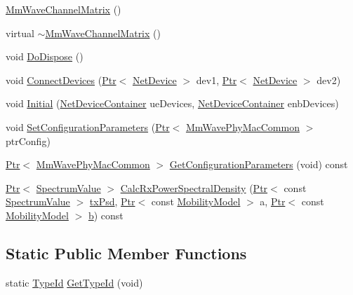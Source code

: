 \begin{DoxyCompactItemize}
\item 
\hyperlink{classns3_1_1MmWaveChannelMatrix_add4feba12917b68e698d28204e67b2cc}{Mm\+Wave\+Channel\+Matrix} ()
\item 
virtual \hyperlink{classns3_1_1MmWaveChannelMatrix_a078a11472a5d2fb7ad31315ba17a2930}{$\sim$\+Mm\+Wave\+Channel\+Matrix} ()
\item 
void \hyperlink{classns3_1_1MmWaveChannelMatrix_a7a20406655c992c2d0e2ffcb67646998}{Do\+Dispose} ()
\item 
void \hyperlink{classns3_1_1MmWaveChannelMatrix_a5ce6561e412404f9da4ef0cd4c6074b6}{Connect\+Devices} (\hyperlink{classns3_1_1Ptr}{Ptr}$<$ \hyperlink{classns3_1_1NetDevice}{Net\+Device} $>$ dev1, \hyperlink{classns3_1_1Ptr}{Ptr}$<$ \hyperlink{classns3_1_1NetDevice}{Net\+Device} $>$ dev2)
\item 
void \hyperlink{classns3_1_1MmWaveChannelMatrix_ab33b65ac0dd3750c6b7856947150ec04}{Initial} (\hyperlink{classns3_1_1NetDeviceContainer}{Net\+Device\+Container} ue\+Devices, \hyperlink{classns3_1_1NetDeviceContainer}{Net\+Device\+Container} enb\+Devices)
\item 
void \hyperlink{classns3_1_1MmWaveChannelMatrix_ac296d6652dbde383f9c9b03494c1f8fe}{Set\+Configuration\+Parameters} (\hyperlink{classns3_1_1Ptr}{Ptr}$<$ \hyperlink{classns3_1_1MmWavePhyMacCommon}{Mm\+Wave\+Phy\+Mac\+Common} $>$ ptr\+Config)
\item 
\hyperlink{classns3_1_1Ptr}{Ptr}$<$ \hyperlink{classns3_1_1MmWavePhyMacCommon}{Mm\+Wave\+Phy\+Mac\+Common} $>$ \hyperlink{classns3_1_1MmWaveChannelMatrix_abd1ba6a33c5eb270875f54fabec7a19b}{Get\+Configuration\+Parameters} (void) const 
\item 
\hyperlink{classns3_1_1Ptr}{Ptr}$<$ \hyperlink{classns3_1_1SpectrumValue}{Spectrum\+Value} $>$ \hyperlink{classns3_1_1MmWaveChannelMatrix_aa6524cfff31f5c6c2d8aca4915ff9f8d}{Calc\+Rx\+Power\+Spectral\+Density} (\hyperlink{classns3_1_1Ptr}{Ptr}$<$ const \hyperlink{classns3_1_1SpectrumValue}{Spectrum\+Value} $>$ \hyperlink{lte__link__budget__x2__handover__measures_8m_a684fe3101a5e48a5fcc57cab8dbcd1aa}{tx\+Psd}, \hyperlink{classns3_1_1Ptr}{Ptr}$<$ const \hyperlink{classns3_1_1MobilityModel}{Mobility\+Model} $>$ a, \hyperlink{classns3_1_1Ptr}{Ptr}$<$ const \hyperlink{classns3_1_1MobilityModel}{Mobility\+Model} $>$ \hyperlink{lte__pathloss_8m_a21ad0bd836b90d08f4cf640b4c298e7c}{b}) const 
\end{DoxyCompactItemize}
\subsection*{Static Public Member Functions}
\begin{DoxyCompactItemize}
\item 
static \hyperlink{classns3_1_1TypeId}{Type\+Id} \hyperlink{classns3_1_1MmWaveChannelMatrix_a7647e15736217d647c4d0d58fbe53612}{Get\+Type\+Id} (void)
\end{DoxyCompactItemize}
